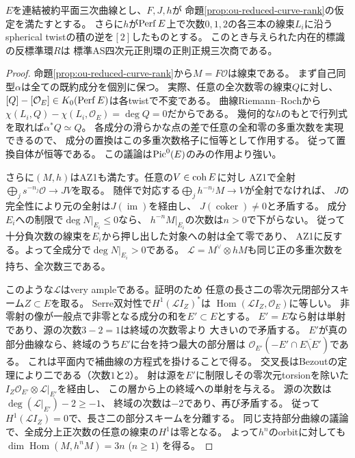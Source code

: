 \begin{proposition}[被約可約三次曲線への条件付き拡張]
\label{prop:ou-reduced-cubic-geometric}
$E$を連結被約平面三次曲線とし、$F,J,h$が
命題\ref{prop:ou-reduced-curve-rank}の仮定を満たすとする。
さらに$h$が$\operatorname{Perf} E$上で次数$0,1,2$の各三本の線束$L_i$に沿う
spherical twistの積の逆を$[2]$したものとする。
このとき与えられた内在的標識の反標準環$R$は
標準AS四次元正則環の正則正規三次商である。
\end{proposition}
\begin{proof}
命題\ref{prop:ou-reduced-curve-rank}から$M=F\mathcal O$は線束である。
まず自己同型$\alpha$は全ての既約成分を個別に保つ。
実際、任意の全次数零の線束$Q$に対し、
$[Q]-[\mathcal O_E]\in K_0(\operatorname{Perf} E)$は各twistで不変である。
曲線Riemann--Rochから
$\chi(L_i,Q)-\chi(L_i,\mathcal O_E)=\deg Q=0$だからである。
幾何的な$h$のもとで行列式を取れば$\alpha^*Q\simeq Q$。
各成分の滑らかな点の差で任意の全和零の多重次数を実現できるので、
成分の置換はこの多重次数格子に恒等として作用する。
従って置換自体が恒等である。
この議論は$\operatorname{Pic}^0(E)$のみの作用より強い。

さらに$(M,h)$はAZ1も満たす。任意の$V\in\operatorname{coh} E$に対し
AZ1で全射$\bigoplus_j s^{-n_j}\mathcal O\to JV$を取る。
随伴で対応する$\bigoplus_j h^{-n_j}M\to V$が全射でなければ、
$J$の完全性により元の全射は$J(\operatorname{im})$を経由し、
$J(\operatorname{coker})\ne0$と矛盾する。
成分$E_i$への制限で$\deg N|_{E_i}\leq0$なら、
$h^{-n}M|_{E_i}$の次数は$n>0$で下がらない。
従って十分負次数の線束を$E_i$から押し出した対象への射は全て零であり、
AZ1に反する。よって全成分で$\deg N|_{E_i}>0$である。
$\mathcal L=M^\vee\otimes hM$も同じ正の多重次数を持ち、全次数三である。

このような$\mathcal L$はvery ampleである。証明のため
任意の長さ二の零次元閉部分スキーム$Z\subset E$を取る。
Serre双対性で$H^1(\mathcal L I_Z)^*$は
$\operatorname{Hom}(\mathcal L I_Z,\mathcal O_E)$に等しい。
非零射の像が一般点で非零となる成分の和を$E'\subset E$とする。
$E'=E$なら射は単射であり、源の次数$3-2=1$は終域の次数零より
大きいので矛盾する。
$E'$が真の部分曲線なら、終域のうち$E'$に台を持つ最大の部分層は
$\mathcal O_{E'}(-E'\cap\overline{E\setminus E'})$である。
これは平面内で補曲線の方程式を掛けることで得る。
交叉長はBezoutの定理により二である（次数$1$と$2$）。
射は源を$E'$に制限しその零次元torsionを除いた
$I_Z\mathcal O_{E'}\otimes\mathcal L|_{E'}$を経由し、
この層から上の終域への単射を与える。
源の次数は$\deg(\mathcal L|_{E'})-2\geq-1$、
終域の次数は$-2$であり、再び矛盾する。
従って$H^1(\mathcal L I_Z)=0$で、長さ二の部分スキームを分離する。
同じ支持部分曲線の議論で、全成分上正次数の任意の線束の$H^1$は零となる。
よって$h^n$のorbitに対しても
$\dim\operatorname{Hom}(M,h^nM)=3n$ ($n\ge1$) を得る。


\end{proof}
